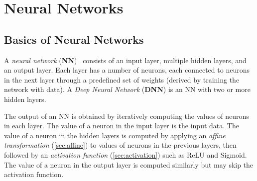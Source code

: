 \documentclass[oneside,11pt,dvipsnames]{book}
\numberwithin{equation}{section}
\theoremstyle{definition}
\theoremstyle{remark}
\begin{document}
\chapter{Neural Networks}\label{sec:basic}

\section{Basics of Neural Networks}
A \emph{neural network} (\textbf{NN})~\cite{Goodfellow-et-al-2016} consists of an input layer, multiple hidden layers, and an output layer. Each layer has a number of neurons, each connected to neurons in the next layer through a predefined set of weights (derived by training the network with data). A \emph{Deep Neural Network} (\textbf{DNN}) is an NN with two or more hidden layers. 


The output of an NN is obtained by iteratively computing  the  values  of  neurons  in  each  layer.
The value of a neuron in the input layer is the input data. The value of a neuron in the hidden layers is computed by applying an \emph{affine transformation} (\autoref{sec:affine}) to values of neurons in the previous layers, then followed by an \emph{activation function} (\autoref{sec:activation}) such as ReLU and Sigmoid. The value of a neuron in the output layer is computed similarly but may skip the activation function.


\end{document}
